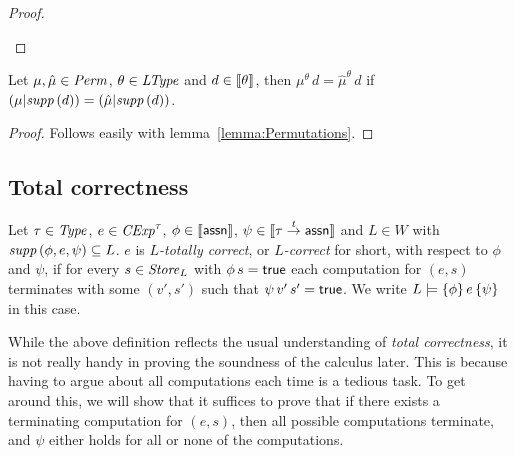 \documentclass[12pt,a4paper]{report}
\newcommand{\CExp}{\nstyle{CExp}}
\newcommand{\id}{\nstyle{id}}
\begin{document}
\begin{proof}
\begin{itemize}
%
  \end{itemize}
\end{proof}

\begin{lemma} \label{lemma:Permutations_and_semantic_domains}
  Let $\mu,\hat{\mu}\in\mathit{Perm}$, $\theta\in\mathit{LType}$ and $d \in \llbracket\theta\rrbracket$, then
  $\mu^\theta\,d = \hat{\mu}^\theta\,d$ if
  $(\mu|\mathit{supp}\,(d)) = (\hat{\mu}|\mathit{supp}\,(d))$.
\end{lemma}

\begin{proof}
  Follows easily with lemma~\ref{lemma:Permutations}.
\end{proof}



\subsection{Total correctness}

\begin{definition}
  Let $\tau\in\mathit{Type}$, $e\in\CExp^\tau$, $\phi\in\llbracket\mathsf{assn}\rrbracket$, $\psi\in\llbracket\tau\stackrel{t}{\to}\mathsf{assn}\rrbracket$
  and $L\in W$ with $\mathit{supp}\,(\phi,e,\psi) \subseteq L$.
  $e$ is {\em $L$-totally correct}, or {\em $L$-correct} for short, with respect to $\phi$ and
  $\psi$, if for every $s\in\mathit{Store}_L$ with $\phi\,s=\mathsf{true}$ each computation for $(e,s)$ terminates with some
  $(v',s')$ such that $\psi\,v'\,s'=\mathsf{true}$. We write $L \models \{\phi\}\,e\,\{\psi\}$ in this case.
\end{definition}

While the above definition reflects the usual understanding of {\em total correctness}, it is not really handy
in proving the soundness of the calculus later. This is because having to argue about all computations each
time is a tedious task. To get around this, we will show that it suffices to prove that if there exists a
terminating computation for $(e,s)$, then all possible computations terminate, and $\psi$ either holds for all
or none of the computations.
\end{document}
